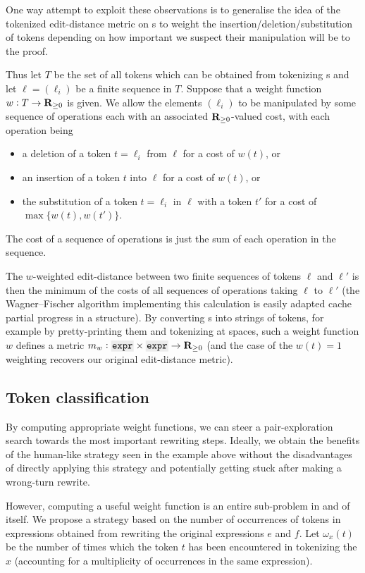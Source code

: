 \documentclass[12pt]{article}
\begin{document}
One way attempt to exploit these observations is to generalise the idea of the tokenized edit-distance metric on s to weight the insertion/deletion/substitution of tokens depending on how important we suspect their manipulation will be to the proof.

Thus let $T$ be the set of all tokens which can be obtained from tokenizing \expr{}s and let $\ell = (\ell_i)$ be a finite sequence in $T$. Suppose that a weight function $w : T \to \mathbf{R}_{\geq 0}$ is given. We allow the elements $(\ell_i)$ to be manipulated by some sequence of operations each with an associated $\mathbf{R}_{\geq 0}$-valued cost, with each operation being
\begin{itemize}
  \item a deletion of a token $t = \ell_i$ from $\ell$ for a cost of $w(t)$, or
  \item an insertion of a token $t$ into $\ell$ for a cost of $w(t)$, or
  \item the substitution of a token $t = \ell_i$ in $\ell$ with a token $t'$ for a cost of $\max\{w(t), w(t')\}$.
\end{itemize}
The cost of a sequence of operations is just the sum of each operation in the sequence.

The $w$-weighted edit-distance between two finite sequences of tokens $\ell$ and $\ell'$ is then the minimum of the costs of all sequences of operations taking $\ell$ to $\ell'$ (the Wagner--Fischer algorithm \cite{wagner1974string} implementing this calculation is easily adapted cache partial progress in a  structure). By converting \expr{}s{} into strings of tokens, for example by pretty-printing them and tokenizing at spaces, such a weight function $w$ defines a metric $m_w : \expr{} \times \expr{} \to \RR_{\geq 0}$ (and the case of the $w(t) = 1$ weighting recovers our original edit-distance metric).

\subsection{Token classification}

By computing appropriate weight functions, we can steer a pair-exploration search towards the most important rewriting steps. Ideally, we obtain the benefits of the human-like strategy seen in the example above without the disadvantages of directly applying this strategy and potentially getting stuck after making a wrong-turn rewrite.

However, computing a useful weight function is an entire sub-problem in and of itself. We propose a strategy based on the number of occurrences of tokens in expressions obtained from rewriting the original expressions $e$ and $f$. Let $\omega_x(t)$ be the number of times which the token $t$ has been encountered in tokenizing the \expr{} $x$ (accounting for a multiplicity of occurrences in the same expression).
\end{document}
